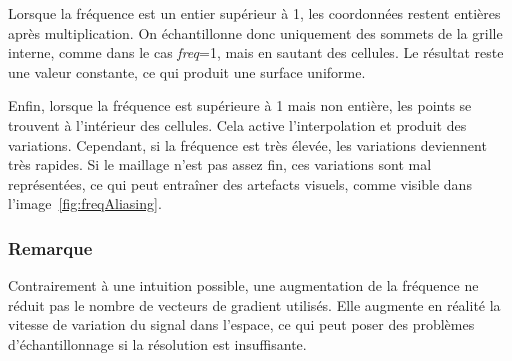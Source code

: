 Lorsque la fréquence est un entier supérieur à 1, les coordonnées restent entières après multiplication.
On échantillonne donc uniquement des sommets de la grille interne, comme dans le cas \textit{freq}=1, mais en sautant des cellules.
Le résultat reste une valeur constante, ce qui produit une surface uniforme.

Enfin, lorsque la fréquence est supérieure à 1 mais non entière, les points se trouvent à l’intérieur des cellules.
Cela active l’interpolation et produit des variations.
Cependant, si la fréquence est très élevée, les variations deviennent très rapides.
Si le maillage n’est pas assez fin, ces variations sont mal représentées, ce qui peut entraîner des artefacts visuels, comme visible dans l'image~\ref{fig:freqAliasing}.

\subsubsection{Remarque}

Contrairement à une intuition possible, une augmentation de la fréquence ne réduit pas le nombre de vecteurs de gradient utilisés.
Elle augmente en réalité la vitesse de variation du signal dans l’espace, ce qui peut poser des problèmes d’échantillonnage si la résolution est insuffisante.
